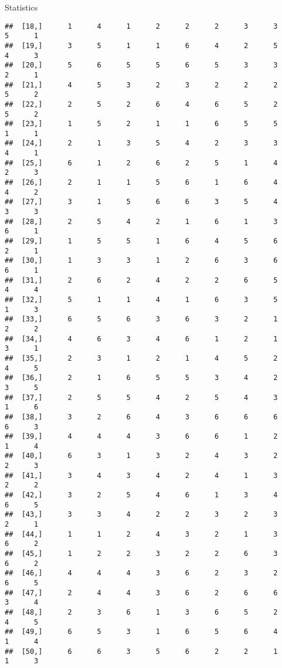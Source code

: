 \documentclass[
  ignorenonframetext,
]{beamer}
\begin{document}
\begin{frame}[fragile]{Statistics}
\begin{verbatim}
##  [18,]      1      4      1      2      2      2      3      3      5      1
##  [19,]      3      5      1      1      6      4      2      5      4      3
##  [20,]      5      6      5      5      6      5      3      3      2      1
##  [21,]      4      5      3      2      3      2      2      2      5      2
##  [22,]      2      5      2      6      4      6      5      2      5      2
##  [23,]      1      5      2      1      1      6      5      5      1      1
##  [24,]      2      1      3      5      4      2      3      3      4      1
##  [25,]      6      1      2      6      2      5      1      4      2      3
##  [26,]      2      1      1      5      6      1      6      4      4      2
##  [27,]      3      1      5      6      6      3      5      4      3      3
##  [28,]      2      5      4      2      1      6      1      3      6      1
##  [29,]      1      5      5      1      6      4      5      6      2      1
##  [30,]      1      3      3      1      2      6      3      6      6      1
##  [31,]      2      6      2      4      2      2      6      5      4      4
##  [32,]      5      1      1      4      1      6      3      5      1      3
##  [33,]      6      5      6      3      6      3      2      1      2      2
##  [34,]      4      6      3      4      6      1      2      1      3      1
##  [35,]      2      3      1      2      1      4      5      2      4      5
##  [36,]      2      1      6      5      5      3      4      2      3      5
##  [37,]      2      5      5      4      2      5      4      3      1      6
##  [38,]      3      2      6      4      3      6      6      6      6      3
##  [39,]      4      4      4      3      6      6      1      2      1      4
##  [40,]      6      3      1      3      2      4      3      2      2      3
##  [41,]      3      4      3      4      2      4      1      3      2      2
##  [42,]      3      2      5      4      6      1      3      4      6      5
##  [43,]      3      3      4      2      2      3      2      3      2      1
##  [44,]      1      1      2      4      3      2      1      3      6      2
##  [45,]      1      2      2      3      2      2      6      3      6      2
##  [46,]      4      4      4      3      6      2      3      2      6      5
##  [47,]      2      4      4      3      6      2      6      6      3      4
##  [48,]      2      3      6      1      3      6      5      2      4      5
##  [49,]      6      5      3      1      6      5      6      4      1      4
##  [50,]      6      6      3      5      6      2      2      1      1      3

\end{verbatim}
\end{frame}
\end{document}
